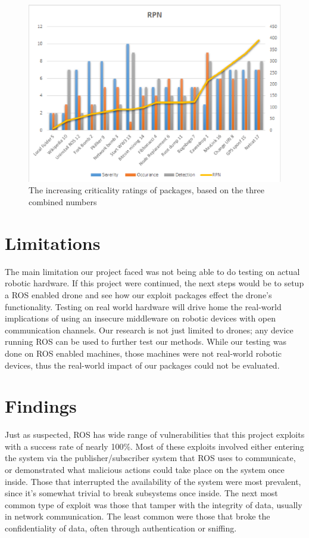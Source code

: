 \documentclass[IEEEtran,letterpaper,10pt,notitlepage,draftclsnofoot]{article}
\begin{document}
\begin{figure}[H]
    \centering
    \includegraphics[width=\textwidth]{RPN.eps}
    \caption{The increasing criticality ratings of packages, based on the three combined numbers}
\end{figure}

\section{Limitations}
The main limitation our project faced was not being able to do testing on actual robotic hardware.
If this project were continued, the next steps would be to setup a ROS enabled drone and see how our exploit packages effect the drone's functionality.
Testing on real world hardware will drive home the real-world implications of using an insecure middleware on robotic devices with open communication channels.
Our research is not just limited to drones; any device running ROS can be used to further test our methods.
While our testing was done on ROS enabled machines, those machines were not real-world robotic devices, thus the real-world impact of our packages could not be evaluated.

\section{Findings}
Just as suspected, ROS has wide range of vulnerabilities that this project exploits with a success rate of nearly 100\%.
Most of these exploits involved either entering the system via the publisher/subscriber system that ROS uses to communicate, or demonstrated what malicious actions could take place on the system once inside.
Those that interrupted the availability of the system were most prevalent, since it's somewhat trivial to break subsystems once inside.
The next most common type of exploit was those that tamper with the integrity of data, usually in network communication.
The least common were those that broke the confidentiality of data, often through authentication or sniffing.
\end{document}
